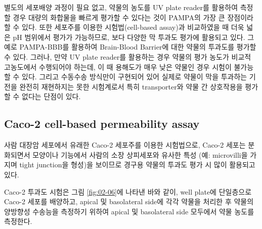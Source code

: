 \documentclass[
  11pt,
  krantz2, a4paper, twoside]{krantz}
\begin{document}
별도의 세포배양 과정이 필요 없고, 약물의 농도를 UV plate reader를
활용하여 측정할 경우 대량의 화합물을 빠르게 평가할 수 있다는 것이
PAMPA의 가장 큰 장점이라 할 수 있다. 또한 세포주를 이용한
시험법(cell-based assay)과 비교하였을 때 더욱 넓은 pH 범위에서 평가가
가능하므로, 보다 다양한 막 투과도 평가에 활용되고 있다. 그 예로
PAMPA-BBB를 활용하여 Brain-Blood Barrier에 대한 약물의 투과도를 평가할
수 있다. 그러나, 만약 UV plate reader를 활용하는 경우 약물의 평가 농도가
비교적 고농도에서 수행되어야 하는데, 이 때 용해도가 매우 낮은 약물인
경우 시험이 불가능할 수 있다. 그리고 수동수송 방식만이 구현되어 있어
실제로 약물이 막을 투과하는 기전을 완전히 재현하지는 못한 시험계로서
특히 transporter와 약물 간 상호작용을 평가할 수 없다는 단점이 있다.

\hypertarget{caco-2-cell-based-permeability-assay}{%
\subsection{Caco-2 cell-based permeability assay}\label{caco-2-cell-based-permeability-assay}}

사람 대장암 세포에서 유래한 Caco-2 세포주를 이용한 시험법으로, Caco-2
세포는 분화되면서 모양이나 기능에서 사람의 소장 상피세포와 유사한 특성
(예: microvilli을 가지며 tight junction을 형성)을 보이므로 경구용 약물의
투과도 평가 시 많이 활용되고 있다.

Caco-2 투과도 시험은 그림 \ref{fig:02-06}에 나타낸 바와 같이, well
plate에 단일층으로 Caco-2 세포를 배양하고, apical 및 basolateral side에
각각 약물을 처리한 후 약물의 양방향성 수송능을 측정하기 위하여 apical 및
basolateral side 모두에서 약물 농도를 측정한다.
\end{document}
